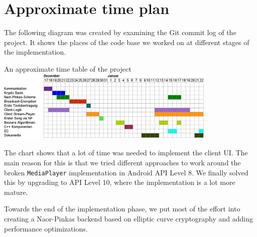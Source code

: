 \documentclass[a4paper,10pt]{scrartcl}
\begin{document}
\section{Approximate time plan}

The following diagram was created by examining the Git commit log of the project. It shows
the places of the code base we worked on at different stages of the implementation.
\newline
\begin{illustration}{An approximate time table of the project}
\includegraphics[width=400px]{timetable.png}
\end{illustration}

The chart shows that a lot of time was needed to implement the client UI. The main reason
for this is that we tried different approaches to work around the broken \lstinline|MediaPlayer|
implementation in Android API Level 8. We finally solved this by upgrading to API Level 10,
where the implementation is a lot more mature.

Towards the end of the implementation phase, we put most of the effort into creating a Naor-Pinkas
backend based on elliptic curve cryptography and adding performance optimizations.
\end{document}
